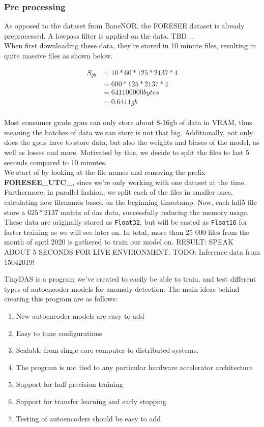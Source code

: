\subsubsection{Pre processing}

As opposed to the dataset from BaneNOR, the FORESEE dataset is already preprocessed. A lowpass filter is applied on the data. TBD ... \\

When first downloading these data, they're stored in 10 minute files, resulting in quite massive files as shown below.  

\begin{align*}
    S_{gb} &= 10 * 60 * 125 * 2137 * 4 \\
           &= 600 * 125 * 2137 * 4 \\
           &= 641100000 bytes \\ 
           &= 0.6411 gb \\
\end{align*}

Most consumer grade \acrshort{gpu}s can only store about 8-16gb of data in VRAM, thus meaning the batches of data we can store is not that big. Additionally, not only does the \acrshort{gpu}s have to store data, but also the weights and biases of the model, as well as losses and more. Motivated by this, we decide to split the files to last 5 seconds compared to 10 minutes. \\ 

We start of by looking at the file names and removing the prefix \textbf{FORESEE\_UTC\_}, since we're only working with one dataset at the time. Furthermore, in parallel fashion, we split each of the files in smaller ones, calculating new filenames based on the beginning timestamp. Now, each \acrshort{hdf5} file store a $625*2137$ matrix of \acrshort{das} data, successfully reducing the memory usage. 
These data are originally stored as \texttt{Float32}, but will be casted as \texttt{Float16} for faster training as we will see later on. In total, more than 25 000 files from the month of april 2020 is gathered to train our model on. 
RESULT: SPEAK ABOUT 5 SECONDS FOR LIVE ENVIRONMENT.
TODO: Inference data from 15042019!

TinyDAS is a program we've created to easily be able to train, and test different types of autoencoder models for anomaly detection. The main ideas behind creating this program are as follows:

\begin{enumerate}
    \item New autoencoder models are easy to add
    \item Easy to tune configurations
    \item Scalable from single core computer to distributed systems.
    \item The program is not tied to any particular hardware accelerator architecture
    \item Support for half precision training
    \item Support for transfer learning and early stopping
    \item Testing of autoencoders should be easy to add
\end{enumerate}

